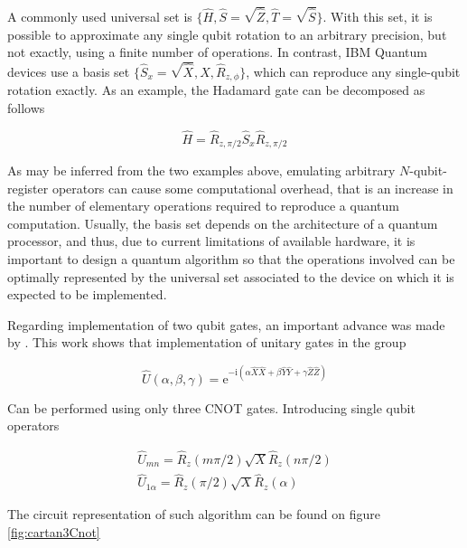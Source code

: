     A commonly used universal set is $\{\hat{H}, \hat{S} = \sqrt{\hat{Z}}, \hat{T} = \sqrt{\hat{S}}\}$. With this set, it is possible to approximate any single qubit rotation to an arbitrary precision, but not exactly, using a finite number of operations. In contrast, IBM Quantum devices use a basis set $\{\hat{S}_x = \sqrt{\hat{X}}, \hat{X}, \hat{R}_{z,\phi} \}$, which can reproduce any single-qubit rotation exactly. As an example, the Hadamard gate can be decomposed as follows

    \begin{equation}
      \hat{H} = \hat{R}_{z,\pi/2} \hat{S}_x \hat{R}_{z,\pi/2}
      \label{eq:hadamard-decomp}
    \end{equation}

    As may be inferred from the two examples above, emulating arbitrary $N$-qubit-register operators can cause some computational overhead, that is an increase in the number of elementary operations required to reproduce a quantum computation. Usually, the basis set depends on the architecture of a quantum processor, and thus, due to current limitations of available hardware, it is important to design a quantum algorithm so that the operations involved can be optimally represented by the universal set associated to the device on which it is expected to be implemented.

    Regarding implementation of two qubit gates, an important advance was made by \cite{BellUniversalCartan}. This work shows that implementation of unitary gates in the group
    
    \begin{equation}
      \hat{U}(\alpha, \beta, \gamma) = \mathrm{e}^{-\mathrm{i}(\alpha\hat{X}\hat{X} + \beta\hat{Y}\hat{Y} + \gamma\hat{Z}\hat{Z})}
      \label{eq:CartanDecomp}
    \end{equation}

    Can be performed using only three CNOT gates. Introducing single qubit operators \cite{RXZPulseEfficient}

    \begin{gather}
      \hat{U}_{mn} = \hat{R}_{z}(m\pi/2)\sqrt{X}\hat{R}_{z}(n\pi/2) \\
      \hat{U}_{1\alpha} = \hat{R}_{z}(\pi/2)\sqrt{X}\hat{R}_{z}(\alpha)
      \label{eq:AuxUnitaryCartan}
    \end{gather}

    The circuit representation of such algorithm can be found on figure \ref{fig:cartan3Cnot}

